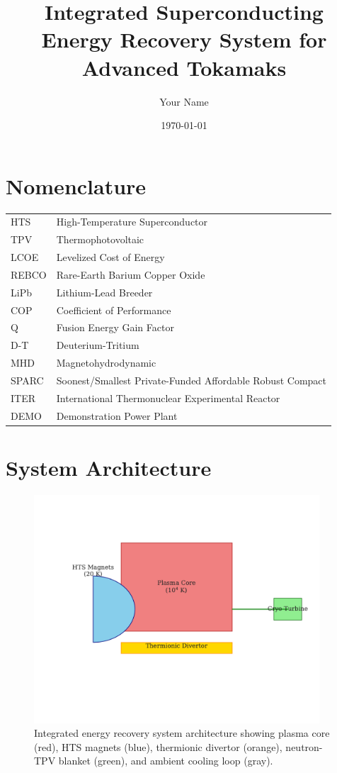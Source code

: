 \documentclass{article}
\title{Integrated Superconducting Energy Recovery System for Advanced Tokamaks}
\author{Your Name}
\date{\today}
\begin{document}
\maketitle

\section*{Nomenclature}
\begin{tabular}{@{}ll@{}}
HTS & High-Temperature Superconductor \\
TPV & Thermophotovoltaic \\
LCOE & Levelized Cost of Energy \\
REBCO & Rare-Earth Barium Copper Oxide \\
LiPb & Lithium-Lead Breeder \\
COP & Coefficient of Performance \\
Q & Fusion Energy Gain Factor \\
D-T & Deuterium-Tritium \\
MHD & Magnetohydrodynamic \\
SPARC & Soonest/Smallest Private-Funded Affordable Robust Compact \\
ITER & International Thermonuclear Experimental Reactor \\
DEMO & Demonstration Power Plant \\
\end{tabular}

\section{System Architecture}
\begin{figure}[ht]
    \centering
    \includegraphics[width=0.95\textwidth]{system_diagram.pdf}
    \caption{Integrated energy recovery system architecture showing plasma core (red), HTS magnets (blue), thermionic divertor (orange), neutron-TPV blanket (green), and ambient cooling loop (gray).}
    \label{fig:system}
\end{figure}
\end{document}
